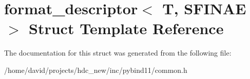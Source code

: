 \hypertarget{structformat__descriptor}{}\section{format\+\_\+descriptor$<$ T, S\+F\+I\+N\+AE $>$ Struct Template Reference}
\label{structformat__descriptor}


The documentation for this struct was generated from the following file\+:\begin{DoxyCompactItemize}
\item 
/home/david/projects/hdc\+\_\+new/inc/pybind11/common.\+h\end{DoxyCompactItemize}
